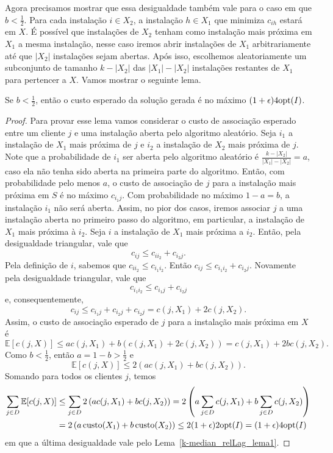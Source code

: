 Agora precisamos mostrar que essa desigualdade também vale para o caso em que $ b < \frac{1}{2}$. Para cada instalação $i \in X_2$, a instalação $h \in X_1$ que minimiza $c_{ih}$ estará em $X$. É possível que instalações de $X_2$ tenham como instalação mais próxima em $X_1$ a mesma instalação, nesse caso iremos abrir instalações de $X_1$ arbitrariamente até que $|X_2|$ instalações sejam abertas. Após isso, escolhemos aleatoriamente um subconjunto de tamanho $k - |X_2|$ das $|X_1| - |X_2|$ instalações restantes de $X_1$ para pertencer a $X$. Vamos mostrar o seguinte lema.
\begin{lemma}
    \label{k-median_relLag_lema2}
    Se $b < \frac{1}{2}$, então o custo esperado da solução gerada é no máximo $(1 + \epsilon)4\mathrm{opt}(I)$.
\end{lemma}
\begin{proof}
Para provar esse lema vamos considerar o custo de associação esperado entre um cliente $j$ e uma instalação aberta pelo algoritmo aleatório. Seja $i_1$ a instalação de $X_1$ mais próxima de $j$ e $i_2$ a instalação de $X_2$ mais próxima de $j$. Note que a probabilidade de $i_1$ ser aberta pelo algoritmo aleatório é $\frac{k - |X_2|}{|X_1| - |X_2|} = a$, caso ela não tenha sido aberta na primeira parte do algoritmo. Então, com probabilidade pelo menos $a$, o custo de associação de $j$ para a instalação mais próxima em $S$ é no máximo $c_{i_1j}$. Com probabilidade no máximo $1 - a = b$, a instalação $i_1$ não será aberta. Assim, no pior dos casos, iremos associar $j$ a uma instalação aberta no primeiro passo do algoritmo, em particular, a instalação de $X_1$ mais próxima à $i_2$. Seja $i$ a instalação  de $X_1$ mais próxima a $i_2$. Então, pela desigualdade triangular, vale que
\[c_{ij} \leq c_{ii_2} + c_{i_2j}.\]
Pela definição de $i$, sabemos que $c_{ii_2} \leq c_{i_1i_2}$. Então \(c_{ij} \leq c_{i_1i_2} + c_{i_2j}\). Novamente pela desigualdade triangular, vale que 
\[c_{i_1i_2} \leq c_{i_1j} + c_{i_2j}\]
e, consequentemente,
\[c_{ij} \leq c_{i_1j} + c_{i_2j} + c_{i_2j} = c(j,X_1) + 2 c(j,X_2).\]
Assim, o custo de associação esperado de $j$ para a instalação mais próxima em $X$ é
\[\mathbb{E}[c(j,X)] \leq a c\left(j,X_1\right) + b\left(c(j,X_1) + 2 c(j,X_2)\right) = c(j,X_1) + 2bc(j,X_2).\] 
Como $b < \frac{1}{2}$, então $a = 1 - b > \frac{1}{2}$ e 
\[\mathbb{E}[c(j,X)] \leq 2\left( a c(j,X_1) + bc(j,X_2)\right).\]
Somando para todos os clientes $j$, temos
\begin{subequations}
    \begin{align*}
        \sum_{j \in D}\mathbb{E}[c(j,X)] &\leq \sum_{j \in D}2\left( a c(j,X_1) + bc(j,X_2)\right) = 2\left(a \sum_{j\in D} c(j,X_1) + b \sum_{j \in D} c(j,X_2)\right) \\
        & = 2\left( a\, \mathrm{custo}(X_1) + b\, \mathrm{custo}(X_2)\right) \leq 2 (1 + \epsilon) 2 \mathrm{opt}(I) = (1+\epsilon) 4\mathrm{opt}(I)
    \end{align*}
\end{subequations}
em que a última desigualdade vale pelo Lema~\ref{k-median_relLag_lema1}.
\end{proof}


